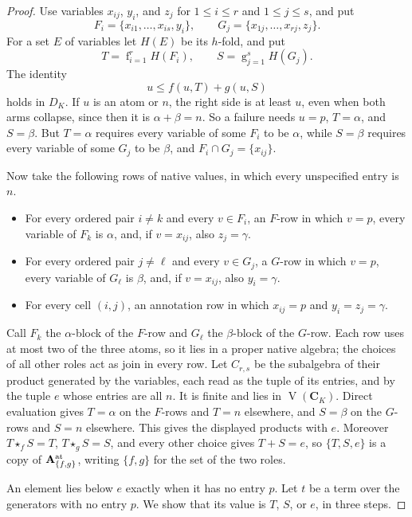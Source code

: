 \begin{proof}
Use variables $x_{ij}$, $y_i$, and $z_j$ for $1\leq i\leq r$ and
$1\leq j\leq s$, and put
\[
 F_i=\{x_{i1},\ldots,x_{is},y_i\},\qquad
 G_j=\{x_{1j},\ldots,x_{rj},z_j\}.
\]
For a set $E$ of variables let $H(E)$ be its $h$-fold, and put
\[
 T=\mathop{f}_{i=1}^{r}H(F_i),\qquad
 S=\mathop{g}_{j=1}^{s}H(G_j).
\]
The identity
\begin{equation}\label{core:eq:padded-crossing-coverage}
 u\leq f(u,T)+g(u,S)
\end{equation}
holds in $D_K$. If $u$ is an atom or $n$, the right side is at least $u$,
even when both arms collapse, since then it is $\alpha+\beta=n$. So a
failure needs $u=p$, $T=\alpha$, and $S=\beta$. But $T=\alpha$ requires
every variable of some $F_i$ to be $\alpha$, while $S=\beta$ requires every
variable of some $G_j$ to be $\beta$, and $F_i\cap G_j=\{x_{ij}\}$.

Now take the following rows of native values, in which every unspecified
entry is $n$.
\begin{itemize}
\item For every ordered pair $i\ne k$ and every $v\in F_i$, an $F$-row in
  which $v=p$, every variable of $F_k$ is $\alpha$, and, if $v=x_{ij}$,
  also $z_j=\gamma$.
\item For every ordered pair $j\ne\ell$ and every $v\in G_j$, a $G$-row in
  which $v=p$, every variable of $G_\ell$ is $\beta$, and, if $v=x_{ij}$,
  also $y_i=\gamma$.
\item For every cell $(i,j)$, an annotation row in which $x_{ij}=p$ and
  $y_i=z_j=\gamma$.
\end{itemize}
Call $F_k$ the $\alpha$-block of the $F$-row and $G_\ell$ the $\beta$-block
of the $G$-row. Each row uses at most two of the three atoms, so it lies in
a proper native algebra; the choices of all other roles act as join in
every row. Let $C_{r,s}$ be the subalgebra of their product
generated by the variables, each read as the tuple of its entries, and by
the tuple $e$ whose entries are all $n$. It is finite and lies in $\operatorname V(\mathbf C_K)$.
Direct evaluation gives $T=\alpha$ on the $F$-rows and $T=n$ elsewhere, and
$S=\beta$ on the $G$-rows and $S=n$ elsewhere. This gives the displayed
products with $e$. Moreover $T\star_f S=T$, $T\star_g S=S$, and every
other choice gives $T+S=e$, so $\{T,S,e\}$ is a copy of
$\mathbf A^{\rm at}_{\{f,g\}}$, writing $\{f,g\}$ for the set of the two
roles.

An element lies below $e$ exactly when it has no entry $p$. Let $t$ be a
term over the generators with no entry $p$. We show that its value is $T$,
$S$, or $e$, in three steps.


\end{proof}
